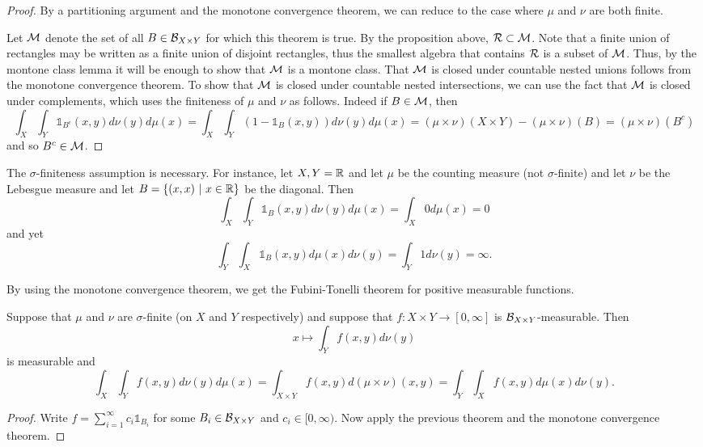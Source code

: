 \documentclass[twoside, a4paper, 10pt]{amsart}
\begin{document}
\begin{proof} By a partitioning argument and the monotone convergence theorem, we can reduce to the case where $\mu$ and $\nu$ are both finite.

Let $\mathcal{M}$ denote the set of all $B \in \mathcal{B}_{X \times Y}$ for which this theorem is true. By the proposition above, $\mathcal{R} \subset \mathcal{M}$. Note that a finite union of rectangles may be written as a finite union of disjoint rectangles, thus the smallest algebra that contains $\mathcal{R}$ is a subset of $\mathcal{M}$. Thus, by the montone class lemma it will be enough to show that $\mathcal{M}$ is a montone class. That $\mathcal{M}$ is closed under countable nested unions follows from the monotone convergence theorem. To show that $\mathcal{M}$ is closed under countable nested intersections, we can use the fact that $\mathcal{M}$ is closed under complements, which uses the finiteness of $\mu$ and $\nu$ as follows. Indeed if $B \in \mathcal{M}$, then $$\int_{X} \int_{Y} \mathds{1}_{B^c}(x,y) d\nu(y) d\mu(x) = \int_{X} \int_{Y} (1-\mathds{1}_B(x,y)) d\nu(y) d\mu(x) = (\mu \times \nu)(X \times Y) - (\mu \times \nu)(B) = (\mu \times \nu)(B^c)$$
and so $B^c \in \mathcal{M}$. \end{proof}

\begin{eg} The $\sigma$-finiteness assumption is necessary. For instance, let $X,Y = \mathbb{R}$ and let $\mu$ be the counting measure (not $\sigma$-finite) and let $\nu$ be the Lebesgue measure and let $B = \{(x,x) ~|~ x \in \mathbb{R}\}$ be the diagonal. Then $$\int_{X} \int_{Y} \mathds{1}_B(x,y) d\nu(y) d\mu(x)  = \int_X 0 d\mu(x) = 0$$ and yet  $$\int_{Y} \int_{X} \mathds{1}_B(x,y) d\mu(x) d\nu(y) = \int_Y 1 d\nu(y) = \infty. $$

\end{eg}

By using the monotone convergence theorem, we get the Fubini-Tonelli theorem for positive measurable functions.

\begin{thm}  Suppose that $\mu$ and $\nu$ are $\sigma$-finite (on $X$ and $Y$ respectively) and suppose that $f:X \times Y \to [0, \infty]$ is $\mathcal{B}_{X \times Y}$-measurable. Then $$x \mapsto \int_{Y} f(x,y) d\nu(y)$$ is measurable and
$$\int_{X} \int_{Y} f(x,y) d\nu(y) d\mu(x)  = \int_{X \times Y} f(x,y) d(\mu \times \nu)(x,y)  = \int_{Y} \int_{X} f(x,y) d\mu(x) d\nu(y). $$
\end{thm}

\begin{proof} Write $f = \sum_{i=1}^{\infty} c_i\mathds{1}_{B_i}$ for some $B_i \in \mathcal{B}_{X \times Y}$ and $c_i \in [0,\infty)$. Now apply the previous theorem and the monotone convergence theorem. \end{proof}
\end{document}

